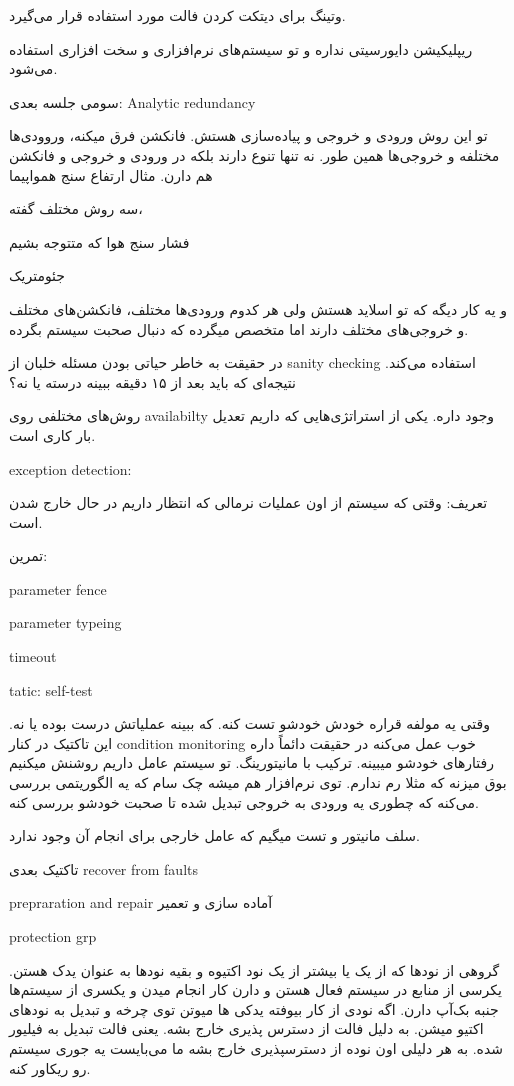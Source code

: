 وتینگ برای دیتکت کردن فالت مورد استفاده قرار می‌گیرد.

ریپلیکیشن دایورسیتی نداره و تو سیستم‌‌های نرم‌افزاری و سخت افزاری استفاده
می‌شود.

سومی جلسه بعدی: Analytic redundancy

تو این روش ورودی و خروجی و پیاده‌سازی هستش. فانکشن فرق میکنه، وروودی‌ها مختلفه و
خروجی‌ها همین طور. نه تنها تنوع دارند بلکه در ورودی و خروجی و فانکشن هم دارن.
مثال ارتفاع سنج همواپیما

سه روش مختلف گفته،

فشار سنج هوا که متتوجه بشیم

جئومتریک

و یه کار دیگه که تو اسلاید هستش ولی هر کدوم ورودی‌ها مختلف، فانکشن‌های مختلف و
خروجی‌های مختلف دارند اما متخصص میگرده که دنبال صحبت سیستم بگرده.

در حقیقت به خاطر حیاتی بودن مسئله خلبان از sanity checking استفاده می‌کند.
نتیجه‌ای که باید بعد از ۱۵ دقیقه ببینه درسته یا نه؟

روش‌های مختلفی روی availabilty وجود داره. یکی از استراتژی‌هایی که داریم تعدیل
بار کاری است.

exception detection:

تعریف: وقتی که سیستم از اون عملیات نرمالی که انتظار داریم در حال خارج شدن است.

تمرین: 

parameter fence

parameter typeing

timeout

tatic: self-test

وقتی یه مولفه قراره خودش خودشو تست کنه. که ببینه عملیاتش درست بوده یا نه. این
تاکتیک در کنار condition monitoring خوب عمل می‌کنه در حقیقت دائماً داره
رفتار‌های خودشو میبینه. ترکیب با مانیتورینگ. تو سیستم عامل داریم روشنش میکنیم
بوق میزنه که مثلا رم ندارم. توی نرم‌افزار هم میشه چک سام که یه الگوریتمی بررسی
می‌کنه که چطوری یه ورودی به خروجی تبدیل شده تا صحبت خودشو بررسی کنه.

سلف مانیتور و تست میگیم که عامل خارجی برای انجام آن وجود ندارد.

تاکتیک بعدی recover from faults

prepraration and repair آماده سازی و تعمیر

protection grp

گروهی از نودها که از یک یا بیشتر از یک نود اکتیوه و بقیه نود‌ها به عنوان یدک
هستن. یکرسی از منابع در سیستم فعال هستن و دارن کار انجام میدن و یکسری از
سیستم‌ها جنبه بک‌آپ دارن. اگه نودی از کار بیوفته یدکی ها میوتن توی چرخه و تبدیل
به نود‌های اکتیو میشن. به دلیل فالت از دسترس پذیری خارج بشه. یعنی فالت تبدیل به
فیلیور شده. به هر دلیلی اون نوده از دسترسپذیری خارج بشه ما می‌بایست یه جوری
سیستم رو ریکاور کنه.


